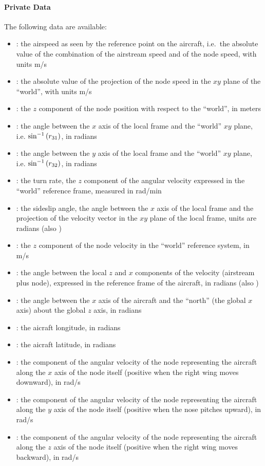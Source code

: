 \paragraph{Private Data}
The following data are available:
\begin{itemize}
\item {}: the airspeed as seen by the reference
	point on the aircraft, i.e.\ the absolute value
	of the combination of the airstream speed and of the node speed,
  with units m/s
\item {}: the absolute value of the projection
	of the node speed in the $xy$ plane of the ``world'', with units m/s
\item {}: the $z$ component of the node position
	with respect to the ``world'', in meters
\item {}: the angle between the $x$ axis of the local
  frame and the ``world'' $xy$ plane,  i.e. $\sin^{-1}\left( r_{31} \right)$,
  in radians
\item {}: the angle between the $y$ axis of the local
	frame and the ``world'' $xy$ plane, i.e. $\sin^{-1}\left( r_{32} \right)$,
  in radians
\item {}: the turn rate, the $z$ component of the angular
  velocity expressed in the ``world'' reference frame, measured in rad/min
\item {}: the sideslip angle, the angle between the $x$ axis of
  the local frame and the projection of the velocity vector in the $xy$
  plane of the local frame, units are radians (also )
\item {}: the $z$ component of the node velocity
	in the ``world'' reference system, in m/s
\item {}: the angle between the local $z$ and $x$ components
	of the velocity (airstream plus node), expressed in the reference frame
  of the aircraft, in radians (also )
\item {}: the angle between the $x$ axis of the aircraft
	and the ``north'' (the global $x$ axis) about the global $z$ axis,
  in radians
\item {}: the aicraft longitude, in radians
\item {}: the aicraft latitude, in radians
\item {}: the component of the angular velocity
	of the node representing the aircraft along the $x$ axis
	of the node itself (positive when the right wing moves downward),
  in rad/s
\item {}: the component of the angular velocity
	of the node representing the aircraft along the $y$ axis
	of the node itself (positive when the nose pitches upward),
  in rad/s
\item {}: the component of the angular velocity
	of the node representing the aircraft along the $z$ axis
	of the node itself (positive when the right wing moves backward),
  in rad/s
\end{itemize}
